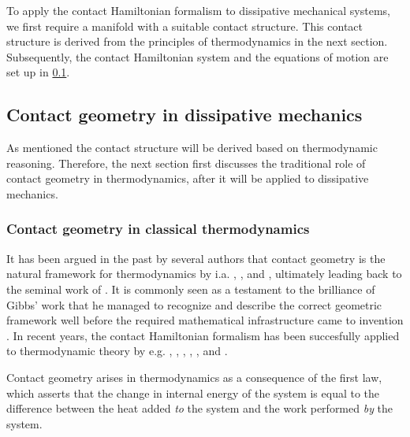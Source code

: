 To apply the contact Hamiltonian formalism to dissipative mechanical systems, we first require a manifold with a suitable contact structure. This contact structure is derived from the principles of thermodynamics in the next section. Subsequently, the contact Hamiltonian system and the equations of motion are set up in \cref{ssec:contact_dissipation}.


\subsection{Contact geometry in dissipative mechanics}
\label{ssec:contact_dissipation}
As mentioned the contact structure will be derived based on thermodynamic reasoning. Therefore, the next section first discusses the traditional role of contact geometry in thermodynamics, after it will be applied to dissipative mechanics.

\subsubsection{Contact geometry in classical thermodynamics}
It has been argued in the past by several authors that contact geometry is the natural framework for thermodynamics by i.a. \citet{Arnold1991,Arnold1989a,Arnold1989,Arnold1989b}, \citet{Bamberg1988}, \citet{Burke1985} and \citet{Hermann1973}, ultimately leading back to the seminal work of \citet{Gibbs1873}. It is commonly seen as a testament to the brilliance of Gibbs' work that he managed to recognize and describe the correct geometric framework well before the required mathematical infrastructure came to invention \cite{Wightman1979}. In recent years, the contact Hamiltonian formalism has been succesfully applied to thermodynamic theory by e.g. \citet{Mrugala1991,Mrugala2000,Mrugala1984,Mrugala1985,Mrugala1993,Mrugala1996}, \citet{Balian2001}, \citet{VanderSchaft2021a,VanderSchaft2018}, \citet{Maschke2018}, \citet{Bravetti2015}, and \citet{Simoes2020}. 

Contact geometry arises in thermodynamics as a consequence of the first law, which asserts that the change in internal energy of the system is equal to the difference between the heat added \emph{to} the system and the work performed \emph{by} the system. 


